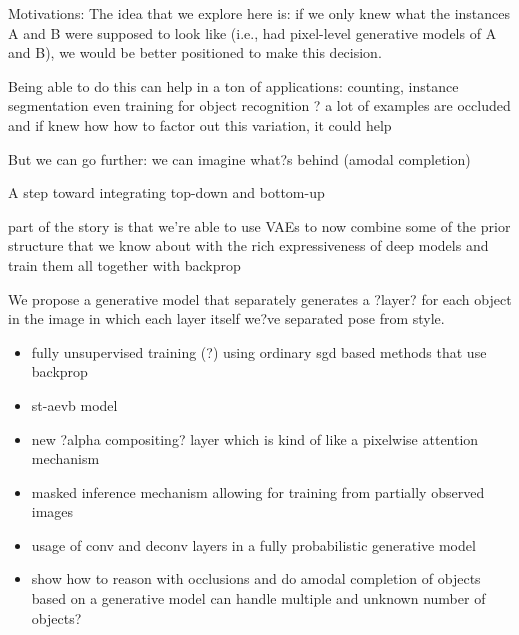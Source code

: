 {Motivations:
	The idea that we explore here is: if we only knew what the instances A and B were supposed to look like (i.e., had pixel-level generative models of A and B), we would be better positioned to make this decision.

	Being able to do this can help in a ton of applications: counting, instance segmentation
		even training for object recognition ? a lot of examples are occluded and if knew how
			how to factor out this variation, it could help
			
	But we can go further: we can imagine what?s behind (amodal completion)

	A step toward integrating top-down and bottom-up
	
	part of the story is that we're able to use VAEs to now combine some of the prior structure that we know about 
		with the rich expressiveness of deep models and train them all together with backprop

We propose a generative model that separately generates a ?layer? for each object in the image
in which each layer itself we?ve separated pose from style.
\begin{itemize}
\item fully unsupervised training (?) using ordinary sgd based methods that use backprop
\item st-aevb model
\item new ?alpha compositing? layer which is kind of like a pixelwise attention mechanism
\item masked inference mechanism allowing for training from partially observed images
\item usage of conv and deconv layers in a fully probabilistic generative model
\item show how to reason with occlusions and do amodal completion of objects based on a generative model
can handle multiple and unknown number of objects?
\end{itemize}
}